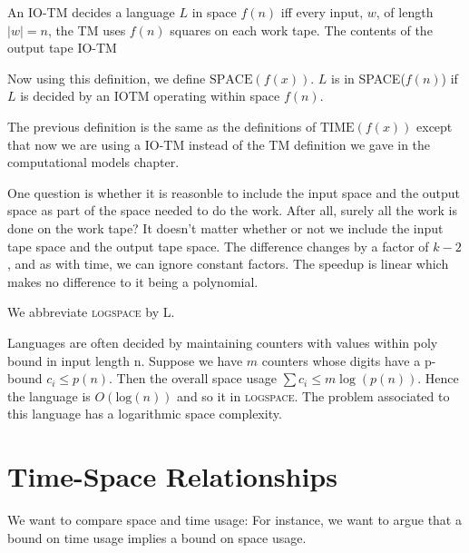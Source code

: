 


An IO-TM decides a language $L$ in space $f(n)$ 
iff every input, $w$, of length $|w| = n$, 
the TM uses $f(n)$ squares on each work tape.
The contents of the output tape IO-TM 

Now using this definition, we define $\text{SPACE}(f(x))$.
$L$ is in SPACE($f(n)$) if $L$ is decided by an IOTM operating
within space $f(n)$. 

The previous definition is the same as 
the definitions of $\text{TIME}(f(x))$ except that now we are 
using a IO-TM instead of the TM definition we gave in the 
computational models chapter. 

One question is whether it is reasonble to include the 
input space and the output space as part of the space needed 
to do the work. After all, surely all the work is done on the 
work tape? It doesn't matter whether or not we include 
the input tape space and the output tape space. 
The difference changes by a factor of $k-2$, 
and as with time, we can ignore constant factors. 
The speedup is linear which makes no difference to it 
being a polynomial. 



We abbreviate \textsc{logspace} by L.

\frmrule

\begin{example}

Languages are often decided by maintaining counters with values within
poly bound in input length n.
Suppose we have $m$ counters whose digits have a 
p-bound $c_i \leqslant p(n)$.
Then the overall space usage $\sum c_i \leqslant m\log(p(n))$. 
Hence the language is $O(\text{log}(n))$ and so it in \textsc{logspace}. 
The problem associated to this language has a 
logarithmic space complexity.

\end{example}




\section{Time-Space Relationships}


We want to compare space and time usage:
For instance, we want to argue that a bound on time usage implies a
bound on space usage. 

